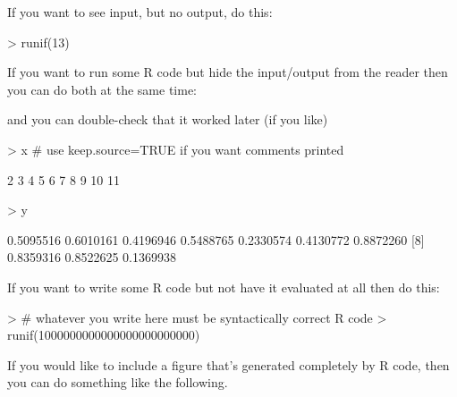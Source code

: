 \documentclass[12pt]{article}         %
\begin{document}
If you want to see input, but no output, do this:

\begin{Schunk}
\begin{Sinput}
> runif(13)
\end{Sinput}
\end{Schunk}

If you want to run some \textsf{R} code but hide the input/output from the reader then you can do both at the same time:


\bigskip   %

and you can double-check that it worked later (if you like)

\begin{Schunk}
\begin{Sinput}
> x  # use keep.source=TRUE if you want comments printed
\end{Sinput}
\begin{Soutput}
 [1]  2  3  4  5  6  7  8  9 10 11
\end{Soutput}
\begin{Sinput}
> y
\end{Sinput}
\begin{Soutput}
 [1] 0.5095516 0.6010161 0.4196946 0.5488765 0.2330574 0.4130772 0.8872260
 [8] 0.8359316 0.8522625 0.1369938
\end{Soutput}
\end{Schunk}

If you want to write some \textsf{R} code but not have it evaluated at all then do this:

\begin{Schunk}
\begin{Sinput}
> # whatever you write here must be syntactically correct R code
> runif(1000000000000000000000000)
\end{Sinput}
\end{Schunk}

If you would like to include a figure that's generated completely by \textsf{R} code, then you can do something like the following.
\end{document}
